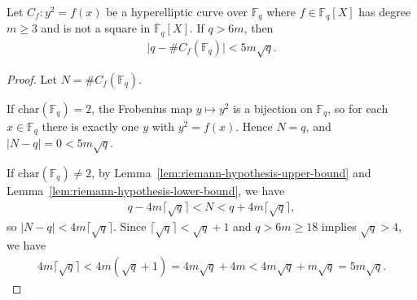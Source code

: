 \begin{theorem}\label{thm:riemann-hypothesis-hec} \leanok {}
  Let $C_f : y^2 = f(x)$ be a hyperelliptic curve over $\mathbb{F}_q$ where $f \in \mathbb{F}_q[X]$ has degree $m \geq 3$ and is not a square in $\overline{\mathbb{F}}_q[X]$. If $q > 6m$, then
  \begin{align*}
    \big|q - \#C_f(\mathbb{F}_q)\big| < 5m\sqrt{q}.
  \end{align*}
\end{theorem}
\begin{proof} \leanok
  Let $N = \#C_f(\mathbb{F}_q)$.

  If $\text{char}(\mathbb{F}_q) = 2$, the Frobenius map $y \mapsto y^2$ is a bijection on $\mathbb{F}_q$, so for each $x \in \mathbb{F}_q$ there is exactly one $y$ with $y^2 = f(x)$. Hence $N = q$, and $|N - q| = 0 < 5m\sqrt{q}$.

  If $\text{char}(\mathbb{F}_q) \neq 2$, by Lemma~\ref{lem:riemann-hypothesis-upper-bound} and Lemma~\ref{lem:riemann-hypothesis-lower-bound}, we have
  \begin{align*}
    q - 4m\lceil\sqrt{q}\rceil < N < q + 4m\lceil\sqrt{q}\rceil,
  \end{align*}
  so $|N - q| < 4m\lceil\sqrt{q}\rceil$. Since $\lceil\sqrt{q}\rceil < \sqrt{q} + 1$ and $q > 6m \geq 18$ implies $\sqrt{q} > 4$, we have
  \begin{align*}
    4m\lceil\sqrt{q}\rceil < 4m(\sqrt{q} + 1) = 4m\sqrt{q} + 4m < 4m\sqrt{q} + m\sqrt{q} = 5m\sqrt{q}.
  \end{align*}
\end{proof}
